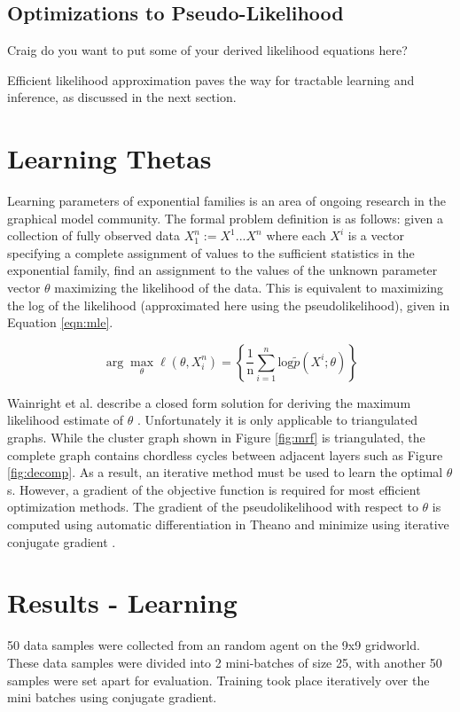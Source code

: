 \documentclass{article} %
\begin{document}
\subsection{Optimizations to Pseudo-Likelihood}
Craig do you want to put some of your derived likelihood equations here?

Efficient likelihood approximation paves the way for tractable learning and inference, as discussed in the next section.

\section{Learning Thetas}
Learning parameters of exponential families is an area of ongoing research in the graphical model community. The formal problem definition is as follows: given a collection of fully observed data $X_1^n := {X^1...X^n}$ where each $X^i$ is a vector specifying a complete assignment of values to the sufficient statistics in the exponential family, find an assignment to the values of the unknown parameter vector $\theta$ maximizing the likelihood of the data. This is equivalent to maximizing the log of the likelihood (approximated here using the pseudolikelihood), given in Equation \ref{eqn:mle}.

\begin{equation}
\arg\max_\theta \ell(\theta,X_i^n)
=
\left\{
  \frac{1}{\textrm{n}}\sum_{i=1}^{n}\textrm{log}\tilde{p}(X^i; \theta)
\right\}
\label{eqn:mle}
\end{equation}

Wainright et al. describe a closed form solution for deriving the maximum likelihood estimate of $\theta$ \cite{wainwright08}. Unfortunately it is only applicable to triangulated graphs. While the cluster graph shown in Figure \ref{fig:mrf} is triangulated, the complete graph contains chordless cycles between adjacent layers such as Figure \ref{fig:decomp}. As a result, an iterative method must be used to learn the optimal $\theta$s. However, a gradient of the objective function is required for most efficient optimization methods. The gradient of the pseudolikelihood with respect to $\theta$ is computed using automatic differentiation in Theano \cite{bergstra10} and minimize using iterative conjugate gradient \cite{hestenes52}. 

\section{Results - Learning}
50 data samples were collected from an random agent on the 9x9 gridworld. These data samples were divided into 2 mini-batches of size 25, with another 50 samples were set apart for evaluation. Training took place iteratively over the mini batches using conjugate gradient.
\end{document}
